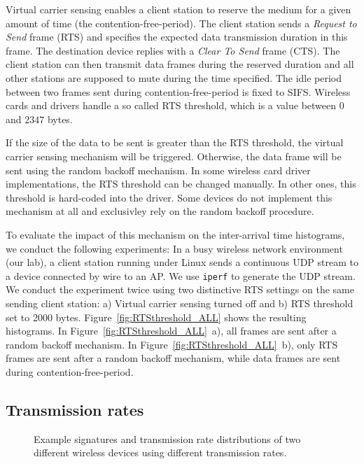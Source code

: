 \documentclass[10pt, conference, compsocconf, letterpaper]{IEEEtran}
\begin{document}
Virtual carrier sensing enables a client station to reserve the medium for a given amount of time (the contention-free-period).
The client station sends a {\em Request to Send} frame (RTS) and specifies the expected data transmission duration in this frame.
The destination device replies with a {\em Clear To Send} frame (CTS).
The client station can then transmit data frames during the reserved duration and all other stations are supposed to mute during the time specified. 
The idle period between two frames sent during contention-free-period is fixed to SIFS.
Wireless cards and drivers handle a so called RTS threshold, which is a value between $0$ and $2347$ bytes.

If the size of the data to be sent is greater than the RTS threshold, the virtual carrier sensing mechanism will be triggered.
Otherwise, the data frame will be sent using the random backoff mechanism.
In some wireless card driver implementations, the RTS threshold can be changed manually. 
In other ones, this threshold is hard-coded into the driver. 
Some devices do not implement this mechanism at all and exclusivley rely on the random backoff procedure.

To evaluate the impact of this mechanism on the inter-arrival time histograms, we conduct the following experiments: 
In a busy wireless network environment (our lab), a client station running under Linux sends a continuous UDP stream to a device connected by wire to an AP.
We use {\tt iperf} to generate the UDP stream.
We conduct the experiment twice using two distinctive RTS settings on the same sending client station:  
a) Virtual carrier sensing turned off and b) RTS threshold set to 2000 bytes.
Figure~\ref{fig:RTSthreshold_ALL} shows the resulting histograms. 
In Figure~\ref{fig:RTSthreshold_ALL}~a), all frames are sent after a random backoff mechanism.
In Figure~\ref{fig:RTSthreshold_ALL}~b), only RTS frames are sent after a random backoff mechanism, while data frames are sent during contention-free-period.





\subsection{Transmission rates}
\label{sec:transmissionrates}


\begin{figure}
\begin{center}
\hfil
{}
\caption{Example signatures and transmission rate distributions of two different wireless devices using different transmission rates.}
\label{fig:transmissionrates}
\end{center}
\end{figure}
\end{document}

